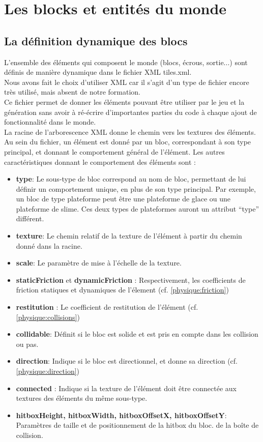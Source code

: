 \documentclass[10pt]{report}
\begin{document}
\section{Les blocks et entités du monde}
\subsection{La définition dynamique des blocs}
L'ensemble des éléments qui composent le monde (blocs, écrous, sortie...) sont définis de manière dynamique dans le fichier XML tiles.xml.\\
Nous avons fait le choix d'utiliser XML car il s'agit d'un type de fichier encore très utilisé, mais absent de notre formation.\\
Ce fichier permet de donner les éléments pouvant être utiliser par le jeu et la génération sans avoir à ré-écrire d'importantes parties du code à chaque ajout de fonctionnalité dans le monde.\\
La racine de l'arborescence XML donne le chemin vers les textures des éléments.\\
Au sein du fichier, un élément est donné par un bloc, correspondant à son type principal, et donnant le comportement général de l'élément. Les autres caractéristiques donnant le comportement des éléments sont :\\
\begin{itemize}
  \item \textbf{type}: Le sous-type de bloc correspond au nom de bloc, permettant de lui définir un comportement unique, en plus de son type principal.
  Par exemple, un bloc de type plateforme peut être une plateforme de glace ou une plateforme de slime.
  Ces deux types de plateformes auront un attribut ``type'' différent.
  \item \textbf{texture}: Le chemin relatif de la texture de l'élément à partir du chemin donné dans la racine.
  \item \textbf{scale}: Le paramètre de mise à l'échelle de la texture.
  \item \textbf{staticFriction} et \textbf{dynamicFriction} : Respectivement, les coefficients de friction statiques et dynamiques de l'élement (cf. \ref{physique:friction})
  \item \textbf{restitution} : Le coefficient de restitution de l'élément (cf. \ref{physique:collisions})
  \item \textbf{collidable}: Définit si le bloc est solide et est pris en compte dans les collision ou pas.
  \item \textbf{direction}: Indique si le bloc est directionnel, et donne sa direction (cf. \ref{physique:direction})
  \item \textbf{connected} : Indique si la texture de l'élément doit être connectée aux textures des éléments du même sous-type.
  \item \textbf{hitboxHeight, hitboxWidth, hitboxOffsetX, hitboxOffsetY}: Paramètres de taille et de positionnement de la hitbox du bloc.
  de la boîte de collision.
\end{itemize}
\end{document}
